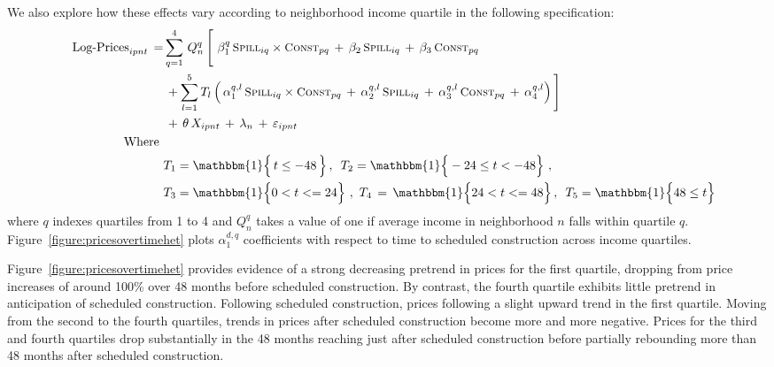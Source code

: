 \documentclass[12pt]{article}
\begin{document}
We also explore how these effects vary according to neighborhood income quartile in the following specification:
\begin{align*}
\quad \text{Log-Prices}_{ipnt} \, =& \sum_{q=1}^{4} \, Q_{n}^{q} \, \Bigg[ \, \, \beta_1^{q} \, \textsc{\small Spill}_{iq}\times\textsc{\small Const}_{pq} \, + \, \beta_2 \, \textsc{\small Spill}_{iq} \, + \, \beta_3 \, \textsc{\small Const}_{pq}\,  \\
 &\, + \sum_{l=1}^{5} T_{l} \, \Big( \, \alpha_1^{q,l} \, \textsc{\small Spill}_{iq}\times\textsc{\small Const}_{pq} \, + \, \alpha_2^{q,l} \, \textsc{\small Spill}_{iq} \, + \, \alpha_3^{q,l} \, \textsc{\small Const}_{pq}\, +\, \alpha_4^{q,l} \Big) \, \Bigg] \\
&\, + \, \theta \, X_{ipnt} \, + \, \lambda_n \, + \, \varepsilon_{ipnt} \quad \\
\text{Where }& \\
&T_1 = \mathbbm{1} \Big\{\, t \leq -48  \,\Big\} \,, \,\,\, T_2 = \mathbbm{1} \Big\{ -24 \leq t < -48 \Big\} \,\,, \\
&T_3 = \mathbbm{1} \Big\{ 0< t<=24 \Big\} \,\, ,\,\,T_4\,=\,\mathbbm{1} \Big\{ 24< t <=48 \Big\} \, , \,\,\, T_5 = \mathbbm{1} \Big\{ 48 \leq t \Big\} 
\end{align*}
\noindent where $q$ indexes quartiles from 1 to 4 and $Q_{n}^{q}$ takes a value of one if average income in neighborhood $n$ falls within quartile $q$.  Figure~\ref{figure:pricesovertimehet} plots $\alpha_1^{d,q}$ coefficients with respect to time to scheduled construction across income quartiles.

Figure~\ref{figure:pricesovertimehet} provides evidence of a strong decreasing pretrend in prices for the first quartile, dropping from price increases of around 100\% over 48 months before scheduled construction.  By contrast, the fourth quartile exhibits little pretrend in anticipation of scheduled construction.  Following scheduled construction, prices following a slight upward trend in the first quartile.  Moving from the second to the fourth quartiles, trends in prices after scheduled construction become more and more negative.  Prices for the third and fourth quartiles drop substantially in the 48 months reaching just after scheduled construction before partially rebounding more than 48 months after scheduled construction.  
\end{document}
